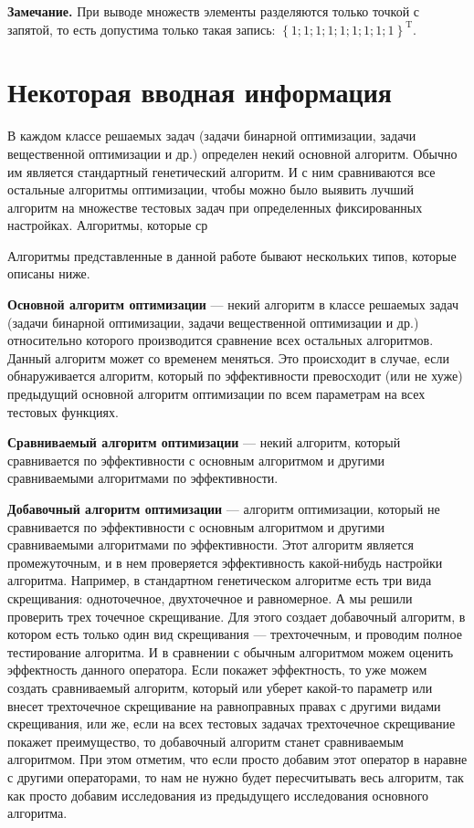 \documentclass[a4paper,12pt]{article}
\begin{document}
\textbf{Замечание.} При выводе множеств элементы разделяются только точкой с запятой, то есть допустима только такая запись: $ {\left\lbrace 1;1;1;1;1;1;1;1;1 \right\rbrace }^\mathrm{T} $.

\section{Некоторая вводная информация}\label{HarrixOptimizationAlgorithms:First}

В каждом классе решаемых задач (задачи бинарной оптимизации, задачи вещественной оптимизации и др.) определен некий основной алгоритм. Обычно им является стандартный генетический алгоритм. И с ним сравниваются все остальные алгоритмы оптимизации, чтобы можно было выявить лучший алгоритм на множестве тестовых задач при определенных фиксированных настройках. Алгоритмы, которые ср

Алгоритмы представленные в данной работе бывают нескольких типов, которые описаны ниже. 

\textbf{Основной алгоритм оптимизации} --- некий алгоритм в классе решаемых задач (задачи бинарной оптимизации, задачи вещественной оптимизации и др.) относительно которого производится сравнение всех остальных алгоритмов. Данный алгоритм может со временем меняться. Это происходит в случае, если обнаруживается алгоритм, который по эффективности превосходит (или не хуже) предыдущий основной алгоритм оптимизации по всем параметрам на всех тестовых функциях.

\textbf{Сравниваемый алгоритм оптимизации} ---  некий алгоритм, который сравнивается по эффективности с основным алгоритмом и другими сравниваемыми алгоритмами по эффективности.

\textbf{Добавочный алгоритм оптимизации} --- алгоритм оптимизации, который не сравнивается по эффективности с основным алгоритмом и другими сравниваемыми алгоритмами по эффективности. Этот алгоритм является промежуточным, и в нем проверяется эффективность какой-нибудь настройки алгоритма. Например, в стандартном генетическом алгоритме есть три вида скрещивания: одноточечное, двухточечное и равномерное. А мы решили проверить трех точечное скрещивание. Для этого создает добавочный алгоритм, в котором есть только один вид скрещивания --- трехточечным, и проводим полное тестирование алгоритма. И в сравнении с обычным алгоритмом можем оценить  эффектность данного оператора. Если покажет эффектность, то уже можем создать сравниваемый алгоритм, который или уберет какой-то параметр или внесет трехточечное скрещивание на равноправных правах с другими видами скрещивания, или же, если на всех тестовых задачах трехточечное скрещивание покажет преимущество, то добавочный алгоритм станет сравниваемым алгоритмом. При этом отметим, что если просто добавим этот оператор в наравне с другими операторами, то нам не нужно будет пересчитывать весь алгоритм, так как просто добавим исследования из предыдущего исследования основного алгоритма.
\end{document}
